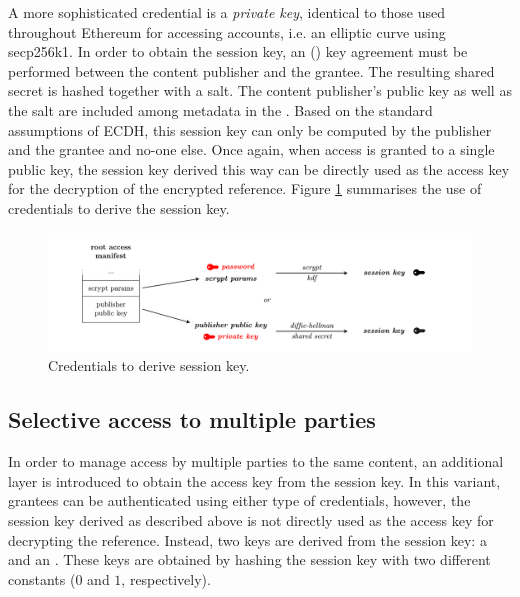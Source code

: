 A more sophisticated credential is a \emph{private key}, identical to those used throughout Ethereum for accessing accounts, i.e. an  elliptic curve using secp256k1. In order to obtain the session key, an  () key agreement must be performed between the content publisher and the grantee. The resulting shared secret is hashed together with a salt. The content publisher's public key as well as the salt are included among metadata in the . Based on the standard assumptions of ECDH, this session key can only be computed by the publisher and the grantee and no-one else. 
Once again, when access is granted to a single public key, the session key derived this way can be directly used as the access key for the decryption of the encrypted reference. 
Figure \ref{fig:credentials-to-derive-session-key} summarises the use of credentials to derive the session key.

\begin{figure}[htbp]
\hspace{-1cm}
\includegraphics[width=1.2\textwidth]{fig/credentials-to-derive-session-key.pdf}
\caption[Credentials to derive session key  \statusyellow]{Credentials to derive session key.}
\label{fig:credentials-to-derive-session-key}
\end{figure}


\subsection{Selective access to multiple parties\statusgreen}

In order to manage access by multiple parties to the same content, an additional layer is introduced to obtain the access key from the session key. In this variant, grantees can be authenticated using either type of credentials, however, the session key derived as
described above is not directly used as the access key for decrypting the reference. Instead, two keys are derived from the session key: a  and an . These keys are obtained by hashing the session key with two different constants ($0$ and $1$, respectively).

